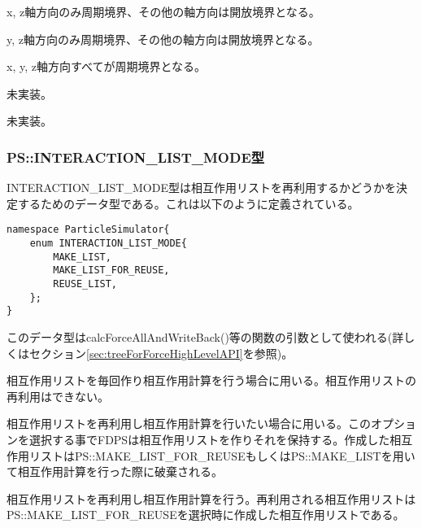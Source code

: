 
x, z軸方向のみ周期境界、その他の軸方向は開放境界となる。


y, z軸方向のみ周期境界、その他の軸方向は開放境界となる。


x, y, z軸方向すべてが周期境界となる。


未実装。


未実装。

\subsubsection{PS::INTERACTION\_LIST\_MODE型}
\label{sec:datatype_enum_interaction_list_mode}


INTERACTION\_LIST\_MODE型は相互作用リストを再利用するかどうかを決定するためのデータ型である。これは以下のように定義されている。

\begin{lstlisting}[caption=boundarycondition]
namespace ParticleSimulator{
    enum INTERACTION_LIST_MODE{
        MAKE_LIST,
        MAKE_LIST_FOR_REUSE,
        REUSE_LIST,
    };
}
\end{lstlisting}

このデータ型はcalcForceAllAndWriteBack()等の関数の引数として使われる(詳しくはセクション\ref{sec:treeForForceHighLevelAPI}を参照)。

相互作用リストを毎回作り相互作用計算を行う場合に用いる。相互作用リストの再利用はできない。

相互作用リストを再利用し相互作用計算を行いたい場合に用いる。このオプションを選択する事でFDPSは相互作用リストを作りそれを保持する。作成した相互作用リストはPS::MAKE\_LIST\_FOR\_REUSEもしくはPS::MAKE\_LISTを用いて相互作用計算を行った際に破棄される。

相互作用リストを再利用し相互作用計算を行う。再利用される相互作用リストはPS::MAKE\_LIST\_FOR\_REUSEを選択時に作成した相互作用リストである。



